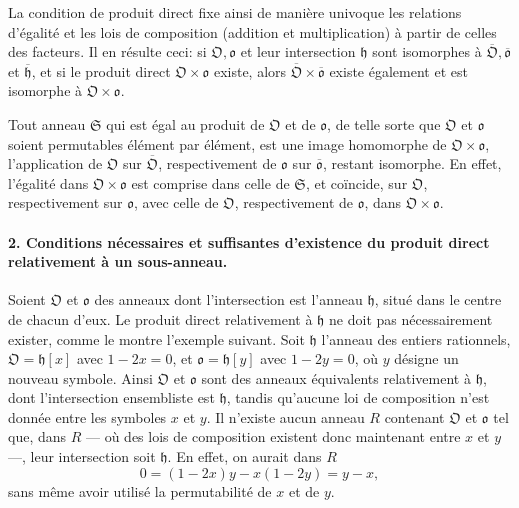 La condition de produit direct fixe ainsi de manière univoque les relations d'égalité et les lois de composition (addition et multiplication) à partir de celles des facteurs. Il en résulte ceci: si \(\mathfrak O,\mathfrak o\) et leur intersection \(\mathfrak h\) sont isomorphes à \(\overline{\mathfrak O},\overline{\mathfrak o}\) et \(\overline{\mathfrak h}\), et si le produit direct \(\mathfrak O\times\mathfrak o\) existe, alors \(\overline{\mathfrak O}\times\overline{\mathfrak o}\) existe également et est isomorphe à \(\mathfrak O\times\mathfrak o\).

Tout anneau \(\mathfrak S\) qui est égal au produit de \(\mathfrak O\) et de \(\mathfrak o\), de telle sorte que \(\mathfrak O\) et \(\mathfrak o\) soient permutables élément par élément, est une image homomorphe de \(\mathfrak O\times\mathfrak o\), l'application de \(\mathfrak O\) sur \(\overline{\mathfrak O}\), respectivement de \(\mathfrak o\) sur \(\overline{\mathfrak o}\), restant isomorphe. En effet, l'égalité dans \(\mathfrak O\times\mathfrak o\) est comprise dans celle de \(\mathfrak S\), et coïncide, sur \(\mathfrak O\), respectivement sur \(\mathfrak o\), avec celle de \(\mathfrak O\), respectivement de \(\mathfrak o\), dans \(\mathfrak O\times\mathfrak o\).

\paragraph{2. Conditions nécessaires et suffisantes d'existence du produit direct relativement à un sous-anneau.}
Soient \(\mathfrak O\) et \(\mathfrak o\) des anneaux dont l'intersection est l'anneau \(\mathfrak h\), situé dans le centre de chacun d'eux. Le produit direct relativement à \(\mathfrak h\) ne doit pas nécessairement exister, comme le montre l'exemple suivant. Soit \(\mathfrak h\) l'anneau des entiers rationnels, \(\mathfrak O=\mathfrak h[x]\) avec \(1-2x=0\), et \(\mathfrak o=\mathfrak h[y]\) avec \(1-2y=0\), où \(y\) désigne un nouveau symbole. Ainsi \(\mathfrak O\) et \(\mathfrak o\) sont des anneaux équivalents relativement à \(\mathfrak h\), dont l'intersection ensembliste est \(\mathfrak h\), tandis qu'aucune loi de composition n'est donnée entre les symboles \(x\) et \(y\). Il n'existe aucun anneau \(R\) contenant \(\mathfrak O\) et \(\mathfrak o\) tel que, dans \(R\) --- où des lois de composition existent donc maintenant entre \(x\) et \(y\) ---, leur intersection soit \(\mathfrak h\). En effet, on aurait dans \(R\)
\[
0=(1-2x)y-x(1-2y)=y-x,
\]
sans même avoir utilisé la permutabilité de \(x\) et de \(y\).


